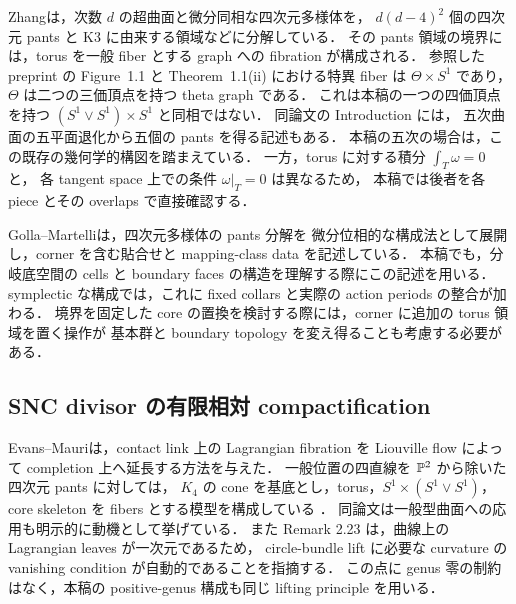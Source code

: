 Zhang\cite[Theorem 1.1]{Zhang}は，次数 $d$ の超曲面と微分同相な四次元多様体を，
$d(d-4)^2$ 個の四次元 pants と K3 に由来する領域などに分解している．
その pants 領域の境界には，torus を一般 fiber とする graph への fibration が構成される．
参照した preprint の Figure~1.1 と Theorem~1.1(ii) における特異 fiber は
$\Theta\times S^1$ であり，$\Theta$ は二つの三価頂点を持つ theta graph である．
これは本稿の一つの四価頂点を持つ $(S^1\vee S^1)\times S^1$ と同相ではない．
同論文の Introduction には，
五次曲面の五平面退化から五個の pants を得る記述もある．
本稿の五次の場合は，この既存の幾何学的構図を踏まえている．
一方，torus に対する積分 $\int_T\omega=0$ と，
各 tangent space 上での条件 $\omega|_T=0$ は異なるため，
本稿では後者を各 piece とその overlaps で直接確認する．

Golla--Martelli\cite{GollaMartelli}は，四次元多様体の pants 分解を
微分位相的な構成法として展開し，corner を含む貼合せと mapping-class data を記述している．
本稿でも，分岐底空間の cells と boundary faces の構造を理解する際にこの記述を用いる．
symplectic な構成では，これに fixed collars と実際の action periods の整合が加わる．
境界を固定した core の置換を検討する際には，corner に追加の torus 領域を置く操作が
基本群と boundary topology を変え得ることも考慮する必要がある．

\subsection{SNC divisor の有限相対 compactification}

Evans--Mauri\cite{EM}は，contact link 上の Lagrangian fibration を
Liouville flow によって completion 上へ延長する方法を与えた．
一般位置の四直線を $\mathbb P^2$ から除いた四次元 pants に対しては，
$K_4$ の cone を基底とし，torus，$S^1\times(S^1\vee S^1)$，
core skeleton を fibers とする模型を構成している
\cite[Lemmas 2.16, 2.22; \S3.1]{EM}．
同論文は一般型曲面への応用も明示的に動機として挙げている．
また Remark 2.23 は，曲線上の Lagrangian leaves が一次元であるため，
circle-bundle lift に必要な curvature の vanishing condition が自動的であることを指摘する．
この点に genus 零の制約はなく，本稿の positive-genus 構成も同じ lifting principle を用いる．

